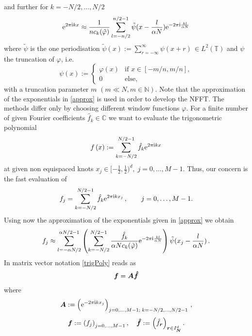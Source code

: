 \documentclass[journal]{IEEEtran}
\def\ti{\mbox{\scriptsize{\rm i}}}
\newcommand{\eip}[1]{{\rm e}^{ 2\pi{\ti} #1}}
\newcommand{\eim}[1]{{\rm e}^{-2\pi{\ti} #1}}
\newcommand{\zb}[1]{\mbox{\boldmath{${#1}$}}}
\newcommand{\zbs}[1]{\mbox{\boldmath\scriptsize{${#1}$}}}
\newcommand{\zbss}[1]{\mbox{\boldmath\tiny{${#1}$}}}
\numberwithin{equation}{section}
\numberwithin{table}{section}
\numberwithin{figure}{section}
\begin{document}
and further for $k=-N/2,\ldots,N/2$
\begin{equation} \label{approx}
\eip{kx}
\approx
\frac{1}{nc_{ k} (\tilde \varphi )}
\sum_{l=-n/2}^{n/2-1}
\tilde\psi (x-\frac{l}{\alpha N})  \eim{\frac{kl}{\alpha N}}
\end{equation}
where $\tilde\psi$ is the one periodisation 
$
\displaystyle\tilde\psi(x) := \sum_{r=-\infty}^{\infty} \psi(x +r)\,
\in L^2(\mathbb{T})
$
and $\psi$ the truncation of $\varphi$, i.e.
\begin{equation}\label{Defpsi}
\psi(x) := \left\{
\begin{array}{ll}
\varphi(x) & \textrm{if }  x \in [- m/n,m/n], \\
0 & \textrm{else},
\end{array} \right.
\end{equation}
with a truncation parameter $m$ $(m\ll N,m\in \mathbb{N})$. 
Note that the approximation of the exponentials in \eqref{approx} is
used in order to develop the NFFT. The methods differ only by choosing
different window functions $\varphi$. 
For a finite number of  
given Fourier coefficients $\hat f_{k} \in \mathbb{C}$
we want to
evaluate the trigonometric polynomial  
\begin{equation}
 \label{trigPoly}
  f\left( x\right) := \sum_{k=-N/2}^{N/2-1} \hat{f}_{k} \eip{ k x}
\end{equation}
at given non equispaced knots $ x_j \in
[-\frac{1}{2},\frac{1}{2})^d,\;j=0,\hdots,M-1$. 
Thus, our concern is the fast evaluation of
\begin{equation*}
 f_j = \sum_{k=-N/2}^{N/2-1} \hat{f}_{k} \eip{k x_j}\,, \qquad
 j=0,\hdots,M-1. 
\end{equation*}
Using now the approximation of the exponentials given in \eqref{approx}
we obtain
\begin{equation}
 \label{NFFTapr}
f_j \approx\sum_{l=-\alpha N/2}^{\alpha N/2-1}\left(
\sum_{ k=-N/2}^{N/2-1} \frac{\hat{f}_{k}}{\alpha N c_{k} (\tilde \varphi )}
\eim{\frac{kl}{\alpha N}}
\right)\tilde\psi (x_j-\frac{l}{\alpha N})  \, .
\end{equation}
In matrix vector notation \eqref{trigPoly} reads as
\begin{equation}
 \label{ndft}
 \zb f=\zb A \zb {\hat f}
\end{equation}
where 
\begin{equation*}
\zb A:=\left(\eim{k x_j}\right)_{j=0,\hdots,M-1;\;k=-N/2,\ldots,N/2-1}\, ,
\end{equation*}
\begin{equation*}
\zb f:=\left(f_j\right)_{j=0,\hdots,M-1},\quad 
\zb {\hat f}:=\left(\hat{f}_{\zbs r}\right)_{\zbs r\in I_{\zbss N}^d}.
\end{equation*}
\end{document}
